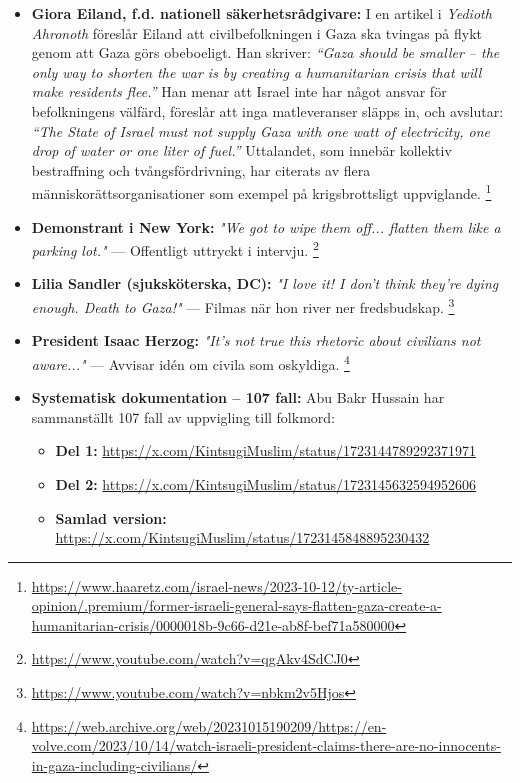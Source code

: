 \documentclass[12pt]{article}
\begin{document}
\begin{itemize}
    \item \textbf{Giora Eiland, f.d. nationell säkerhetsrådgivare:} I en artikel i \textit{Yedioth Ahronoth} föreslår Eiland att civilbefolkningen i Gaza ska tvingas på flykt genom att Gaza görs obeboeligt. Han skriver: \textit{“Gaza should be smaller – the only way to shorten the war is by creating a humanitarian crisis that will make residents flee.”} Han menar att Israel inte har något ansvar för befolkningens välfärd, föreslår att inga matleveranser släpps in, och avslutar: \textit{“The State of Israel must not supply Gaza with one watt of electricity, one drop of water or one liter of fuel.”} Uttalandet, som innebär kollektiv bestraffning och tvångsfördrivning, har citerats av flera människorättsorganisationer som exempel på krigsbrottsligt uppviglande. \footnote{\url{https://www.haaretz.com/israel-news/2023-10-12/ty-article-opinion/.premium/former-israeli-general-says-flatten-gaza-create-a-humanitarian-crisis/0000018b-9c66-d21e-ab8f-bef71a580000}}


    \item \textbf{Demonstrant i New York:} \textit{"We got to wipe them off... flatten them like a parking lot."} — Offentligt uttryckt i intervju. \footnote{\url{https://www.youtube.com/watch?v=qgAkv4SdCJ0}}

    \item \textbf{Lilia Sandler (sjuksköterska, DC):} \textit{"I love it! I don’t think they’re dying enough. Death to Gaza!"} — Filmas när hon river ner fredsbudskap. \footnote{\url{https://www.youtube.com/watch?v=nbkm2v5Hjos}}

    \item \textbf{President Isaac Herzog:} \textit{"It’s not true this rhetoric about civilians not aware..."} — Avvisar idén om civila som oskyldiga. \footnote{\url{https://web.archive.org/web/20231015190209/https://en-volve.com/2023/10/14/watch-israeli-president-claims-there-are-no-innocents-in-gaza-including-civilians/}}

    \item[] \textbf{Systematisk dokumentation – 107 fall:}
    Abu Bakr Hussain har sammanställt 107 fall av uppvigling till folkmord:
    \begin{itemize}
        \item \textbf{Del 1:} \url{https://x.com/KintsugiMuslim/status/1723144789292371971}
        \item \textbf{Del 2:} \url{https://x.com/KintsugiMuslim/status/1723145632594952606}
        \item \textbf{Samlad version:} \url{https://x.com/KintsugiMuslim/status/1723145848895230432}
    \end{itemize}


\end{itemize}
\end{document}
